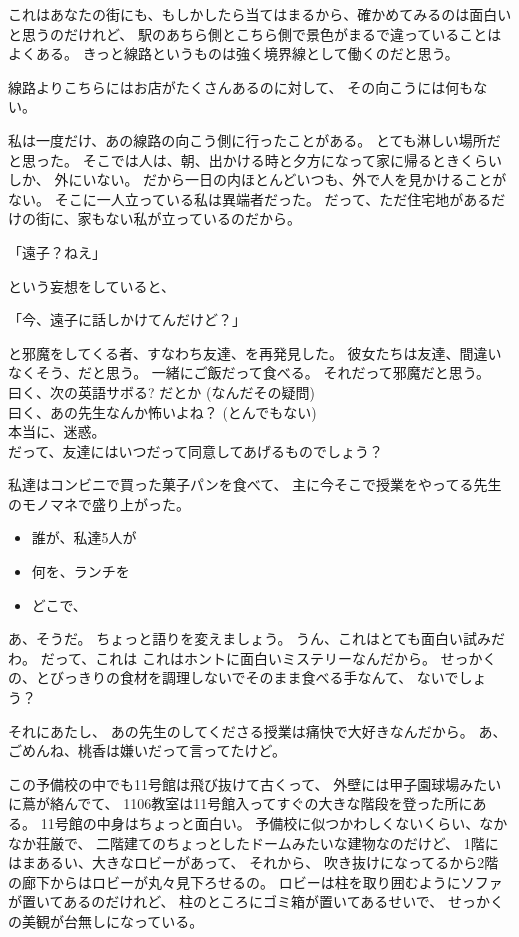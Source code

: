 \documentclass[]{book}
\begin{document}
これはあなたの街にも、もしかしたら当てはまるから、確かめてみるのは面白いと思うのだけれど、
駅のあちら側とこちら側で景色がまるで違っていることはよくある。
きっと線路というものは強く境界線として働くのだと思う。

線路よりこちらにはお店がたくさんあるのに対して、
その向こうには何もない。

私は一度だけ、あの線路の向こう側に行ったことがある。
とても淋しい場所だと思った。
そこでは人は、朝、出かける時と夕方になって家に帰るときくらいしか、
外にいない。 だから一日の内ほとんどいつも、外で人を見かけることがない。
そこに一人立っている私は異端者だった。
だって、ただ住宅地があるだけの街に、家もない私が立っているのだから。

「遠子？ねえ」

という妄想をしていると、

「今、遠子に話しかけてんだけど？」

と邪魔をしてくる者、すなわち友達、を再発見した。
彼女たちは友達、間違いなくそう、だと思う。 一緒にご飯だって食べる。
それだって邪魔だと思う。\\曰く、次の英語サボる? だとか
(なんだその疑問)\\曰く、あの先生なんか怖いよね？
(とんでもない)\\本当に、迷惑。\\だって、友達にはいつだって同意してあげるものでしょう？

私達はコンビニで買った菓子パンを食べて、
主に今そこで授業をやってる先生のモノマネで盛り上がった。

\begin{itemize}
\itemsep1pt\parskip0pt
\item
  誰が、私達5人が
\item
  何を、ランチを
\item
  どこで、
\end{itemize}

あ、そうだ。 ちょっと語りを変えましょう。
うん、これはとても面白い試みだわ。 だって、これは
これはホントに面白いミステリーなんだから。
せっかくの、とびっきりの食材を調理しないでそのまま食べる手なんて、
ないでしょう？

それにあたし、 あの先生のしてくださる授業は痛快で大好きなんだから。
あ、ごめんね、桃香は嫌いだって言ってたけど。

この予備校の中でも11号館は飛び抜けて古くって、
外壁には甲子園球場みたいに蔦が絡んでて、
1106教室は11号館入ってすぐの大きな階段を登った所にある。
11号館の中身はちょっと面白い。
予備校に似つかわしくないくらい、なかなか荘厳で、
二階建てのちょっとしたドームみたいな建物なのだけど、
1階にはまあるい、大きなロビーがあって、 それから、
吹き抜けになってるから2階の廊下からはロビーが丸々見下ろせるの。
ロビーは柱を取り囲むようにソファが置いてあるのだけれど、
柱のところにゴミ箱が置いてあるせいで、
せっかくの美観が台無しになっている。
\end{document}

